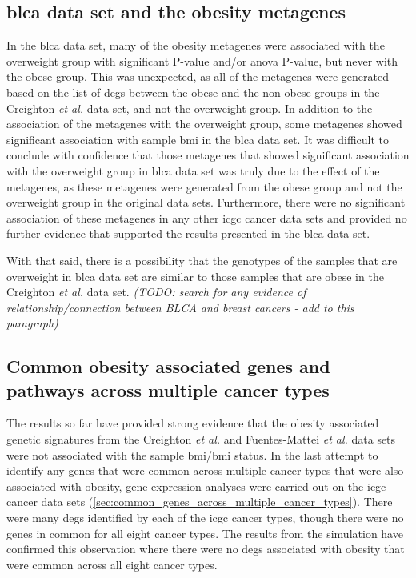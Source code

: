 \subsection{\Gls{blca} data set and the obesity metagenes}
\label{sub:blca_and_obesity_metagenes}

In the \gls{blca} data set, many of the obesity metagenes were associated with the overweight group with significant P-value and/or \gls{anova} P-value, but never with the obese group.
This was unexpected, as all of the metagenes were generated based on the list of \glspl{deg} between the obese and the non-obese groups in the Creighton \textit{et al.} data set, and not the overweight group.
In addition to the association of the metagenes with the overweight group, some metagenes showed significant association with sample \gls{bmi} in the \gls{blca} data set.
It was difficult to conclude with confidence that those metagenes that showed significant association with the overweight group in \gls{blca} data set was truly due to the effect of the metagenes, as these metagenes were generated from the obese group and not the overweight group in the original data sets.
Furthermore, there were no significant association of these metagenes in any other \gls{icgc} cancer data sets and provided no further evidence that supported the results presented in the \gls{blca} data set.

With that said, there is a possibility that the genotypes of the samples that are overweight in \gls{blca} data set are similar to those samples that are obese in the Creighton \textit{et al.} data set.
\textit{(TODO: search for any evidence of relationship/connection between BLCA and breast cancers - add to this paragraph)}

\subsection{Common obesity associated genes and pathways across multiple cancer types}
\label{sub:common_obesity_associated_genes_and_pathways_across_multiple_cancer_types}

The results so far have provided strong evidence that the obesity associated genetic signatures from the Creighton \textit{et al.} and Fuentes-Mattei \textit{et al.} data sets were not associated with the sample \gls{bmi}/\gls{bmi} status.
In the last attempt to identify any genes that were common across multiple cancer types that were also associated with obesity, gene expression analyses were carried out on the \gls{icgc} cancer data sets (\cref{sec:common_genes_across_multiple_cancer_types}).
There were many \glspl{deg} identified by each of the \gls{icgc} cancer types, though there were no genes in common for all eight cancer types.
The results from the simulation have confirmed this observation where there were no \glspl{deg} associated with obesity that were common across all eight cancer types.

